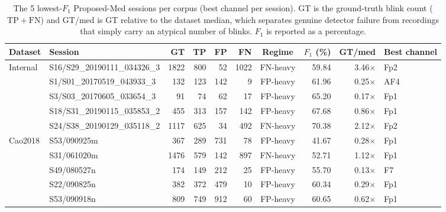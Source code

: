 \begin{table}[ht]
  \centering
  \scriptsize
  \setlength{\tabcolsep}{4pt}
  \caption{The 5 lowest-$F_1$ Proposed-Med sessions per corpus (best channel per session). GT is the ground-truth blink count ($\mathrm{TP}+\mathrm{FN}$) and GT/med is GT relative to the dataset median, which separates genuine detector failure from recordings that simply carry an atypical number of blinks. $F_1$ is reported as a percentage.}
  \label{tab:failure_analysis}
  \begin{tabular}{llrrrrcrrl}
    \toprule
    Dataset & Session & GT & TP & FP & FN & Regime & $F_1$ (\%) & GT/med & Best channel \\
    \midrule
    Internal & S16/S29\_20190111\_034326\_3 & 1822 & 800 & 52 & 1022 & FN-heavy & 59.84 & 3.46$\times$ & Fp2 \\
     & S1/S01\_20170519\_043933\_3 & 132 & 123 & 142 & 9 & FP-heavy & 61.96 & 0.25$\times$ & AF4 \\
     & S3/S03\_20170605\_033654\_3 & 91 & 74 & 62 & 17 & FP-heavy & 65.20 & 0.17$\times$ & Fp1 \\
     & S18/S31\_20190115\_035853\_2 & 455 & 313 & 157 & 142 & FP-heavy & 67.68 & 0.86$\times$ & Fp1 \\
     & S24/S38\_20190129\_035118\_2 & 1117 & 625 & 34 & 492 & FN-heavy & 70.38 & 2.12$\times$ & Fp2 \\
    \midrule
    Cao2018 & S53/090925m & 367 & 289 & 731 & 78 & FP-heavy & 41.67 & 0.28$\times$ & Fp1 \\
     & S31/061020m & 1476 & 579 & 142 & 897 & FN-heavy & 52.71 & 1.12$\times$ & Fp1 \\
     & S49/080527n & 174 & 149 & 212 & 25 & FP-heavy & 55.70 & 0.13$\times$ & F7 \\
     & S22/090825n & 382 & 372 & 479 & 10 & FP-heavy & 60.34 & 0.29$\times$ & Fp1 \\
     & S53/090918n & 809 & 749 & 912 & 60 & FP-heavy & 60.65 & 0.62$\times$ & Fp1 \\
    \bottomrule
  \end{tabular}
\end{table}
